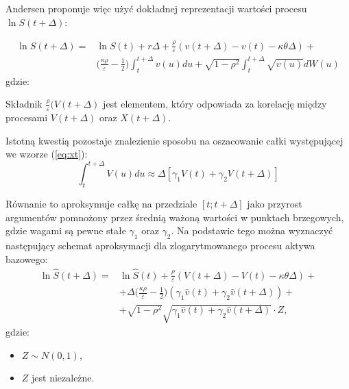 \documentclass{pracamgr}
\begin{document}
Andersen proponuje więc użyć dokładnej reprezentacji wartości procesu $\ln S(t + \Delta)$:

\begin{equation}
\begin{aligned}
\label{eq:xt}
\ln S(t + \Delta) = & \ln S(t) + r \Delta + \frac{\rho}{\varepsilon} (v(t + \Delta)  - v(t) - \kappa \theta \Delta) + \\
& \Big( \frac{\kappa \rho}{\varepsilon} - \frac{1}{2} \Big)
\int_t^{t+\Delta} v(u) du + \sqrt{1-\rho^2} \int_t^{t+\Delta} \sqrt{v(u)}dW(u)
\end{aligned}
\end{equation}
gdzie:

Składnik $\frac{\rho}{\varepsilon} (V(t + \Delta)$ jest elementem, który odpowiada za korelację między 
procesami $V(t + \Delta)$ oraz $X(t + \Delta)$.

Istotną kwestią pozostaje znalezienie sposobu na oszacowanie całki występującej we wzorze (\ref{eq:xt}):
\begin{equation}
  \int_t^{t+\Delta}  V(u) du \approx \Delta [\gamma_1 V(t) + \gamma_2 V(t + \Delta)]
\end{equation}

Równanie to aproksymuje całkę na przedziale $[t; t + \Delta]$ 
jako przyrost argumentów pomnożony przez średnią ważoną wartości w punktach brzegowych, gdzie wagami 
są pewne stałe $\gamma_1$ oraz $\gamma_2$. Na podstawie tego można wyznaczyć 
następujący schemat aproksymacji dla zlogarytmowanego procesu aktywa bazowego:
\begin{equation}
\begin{aligned}
\label{eq:lnxhatt}
\ln \hat{S}(t + \Delta) = & \ln \hat{S}(t)  + \frac{\rho}{\varepsilon} (V(t + \Delta)  - V(t) - \kappa \theta \Delta) + \\
& + \Delta \Big( \frac{\kappa \rho}{\varepsilon} - \frac{1}{2} \Big) (\gamma_1 \hat{v}(t) + \gamma_2 \hat{v}(t + \Delta)) + \\
& + \sqrt{1-\rho^2} \sqrt{\gamma_1 \hat{v}(t) + \gamma_2 \hat{v}(t + \Delta)} \cdot Z,
\end{aligned}
\end{equation}
gdzie: 
\begin{itemize}
  \item $Z \sim N(0,1)$,
  \item $Z$ jest niezależne.
\end{itemize}
\end{document}
